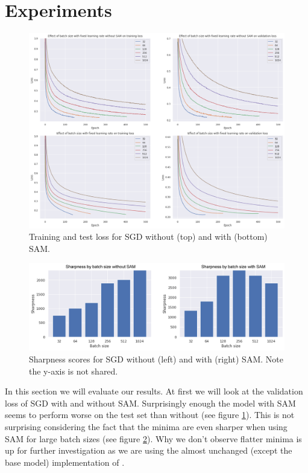 \documentclass[10pt,conference,compsocconf]{IEEEtran}
\begin{document}
\section{Experiments}
\begin{figure}[tbp]
  \centering
  \includegraphics[width=\columnwidth]{img/figure1_val_loss_with_without_sam_sgd}
  \caption{Training and test loss for SGD without (top) and with (bottom) SAM.}
  \vspace{-3mm}
  \label{fig:val-loss-with-without}
\end{figure}
\begin{figure}[tbp]
  \centering
  \includegraphics[width=\columnwidth]{img/figure2_sharpness_with_without_sam_sgd}
  \caption{Sharpness scores for SGD without (left) and with (right) SAM. Note the y-axis is not shared.}
  \vspace{-3mm}
  \label{fig:sharpness-with-without}
\end{figure}
In this section we will evaluate our results. At first we will look at the validation loss of SGD with and without SAM. Surprisingly enough the model with SAM seems to perform worse on the test set than without (see figure \ref{fig:val-loss-with-without}). This is not surprising considering the fact that the minima are even sharper when using SAM for large batch sizes (see figure \ref{fig:sharpness-with-without}). Why we don't observe flatter minima is up for further investigation as we are using the almost unchanged (except the base model) implementation of \cite{paulSharpnessAwareMinimizationTensorFlow2022}.
\end{document}
